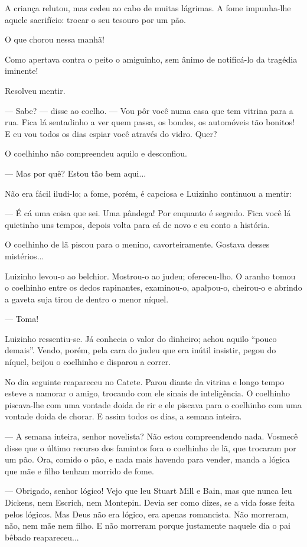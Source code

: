 A criança relutou, mas cedeu ao cabo de muitas lágrimas. A fome
impunha-lhe aquele sacrifício: trocar o seu tesouro por um pão.

O que chorou nessa manhã!

Como apertava contra o peito o amiguinho, sem ânimo de notificá-lo da
tragédia iminente!

Resolveu mentir.

--- Sabe? --- disse ao coelho. --- Vou pôr você numa casa que tem
vitrina para a rua. Fica lá sentadinho a ver quem passa, os bondes, os
automóveis tão bonitos! E eu vou todos os dias espiar você através do
vidro. Quer?

O coelhinho não compreendeu aquilo e desconfiou.

--- Mas por quê? Estou tão bem aqui...

Não era fácil iludi-lo; a fome, porém, é capciosa e Luizinho continuou a
mentir:

--- É cá uma coisa que sei. Uma pândega! Por enquanto é segredo. Fica
você lá quietinho uns tempos, depois volta para cá de novo e eu conto a
história.

O coelhinho de lã piscou para o menino, cavorteiramente. Gostava desses
mistérios...

Luizinho levou-o ao belchior. Mostrou-o ao judeu; ofereceu-lho. O aranho
tomou o coelhinho entre os dedos rapinantes, examinou-o, apalpou-o,
cheirou-o e abrindo a gaveta suja tirou de dentro o menor níquel.

--- Toma!

Luizinho ressentiu-se. Já conhecia o valor do dinheiro; achou aquilo
``pouco demais''. Vendo, porém, pela cara do judeu que era inútil
insistir, pegou do níquel, beijou o coelhinho e disparou a correr.

No dia seguinte reapareceu no Catete. Parou diante da vitrina e longo
tempo esteve a namorar o amigo, trocando com ele sinais de inteligência.
O coelhinho piscava-lhe com uma vontade doida de rir e ele piscava para
o coelhinho com uma vontade doida de chorar. E assim todos os dias, a
semana inteira.

--- A semana inteira, senhor novelista? Não estou compreendendo nada.
Vosmecê disse que o último recurso dos famintos fora o coelhinho de lã,
que trocaram por um pão. Ora, comido o pão, e nada mais havendo para
vender, manda a lógica que mãe e filho tenham morrido de fome.

--- Obrigado, senhor lógico! Vejo que leu Stuart Mill e Bain, mas que
nunca leu Dickens, nem Escrich, nem Montepin. Devia ser como dizes, se a
vida fosse feita pelos lógicos. Mas Deus não era lógico, era apenas
romancista. Não morreram, não, nem mãe nem filho. E não morreram porque
justamente naquele dia o pai bêbado reapareceu...

